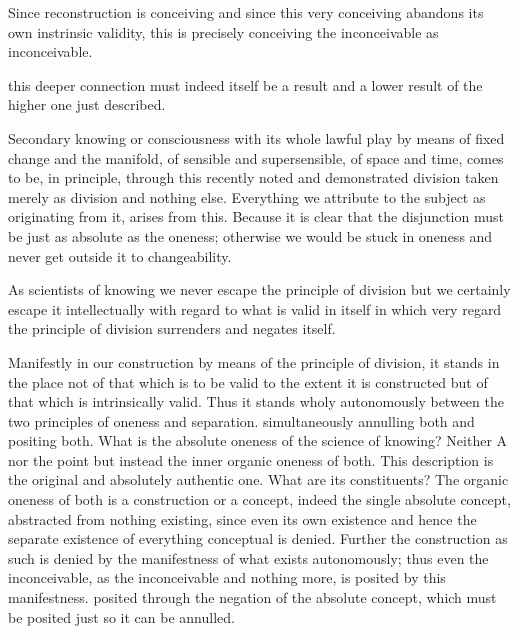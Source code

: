 \documentclass{article}
\begin{document}
Since reconstruction is conceiving
and since this very conceiving abandons its own instrinsic validity,
this is precisely conceiving the inconceivable as inconceivable.

this deeper connection must indeed itself be a result
and a lower result of the higher one just described.

Secondary knowing or consciousness with its whole lawful play
by means of fixed change and the manifold, of sensible and supersensible,
of space and time, comes to be, in principle,
through this recently noted and demonstrated
division taken merely as division and nothing else.
Everything we attribute to the subject as originating from it, arises from this.
Because it is clear that the disjunction must be just as absolute as the oneness;
otherwise we would be stuck in oneness and never get outside it to changeability.

As scientists of knowing we never escape the principle of division
but we certainly escape it intellectually with regard to what is valid in itself
in which very regard the principle of division surrenders and negates itself.

Manifestly in our construction by means of the principle of division,
it stands in the place not of 
that which is to be valid to the extent it is constructed
but of that which is intrinsically valid.
Thus it stands wholy autonomously between the two principles of oneness and separation.
simultaneously annulling both and positing both.
What is the absolute oneness of the science of knowing?
Neither A nor the point but instead the inner organic oneness of both.
This description is the original and absolutely authentic one.
What are its constituents?
The organic oneness of both is a construction or a concept,
indeed the single absolute concept, abstracted from nothing existing,
since even its own existence and hence the separate existence of
everything conceptual is denied.
Further the construction as such is denied by the manifestness
of what exists autonomously;
thus even the inconceivable, as the inconceivable and nothing more,
is posited by this manifestness.
posited through the negation of the absolute concept,
which must be posited just so it can be annulled.
\end{document}
